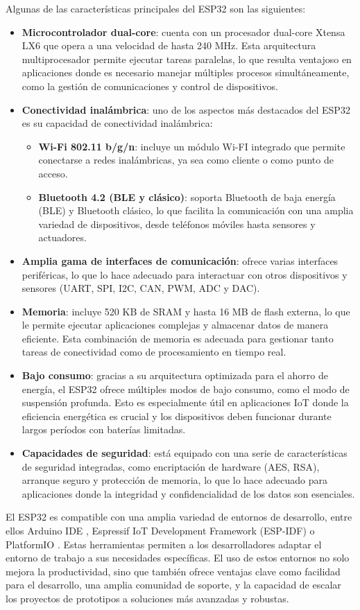  
Algunas de las características principales del ESP32 son las siguientes:
\begin{itemize}
    \item \textbf{Microcontrolador dual-core}: cuenta con un procesador dual-core Xtensa LX6 que opera a una velocidad de hasta 240 MHz. Esta arquitectura multiprocesador permite ejecutar tareas paralelas, lo que resulta ventajoso en aplicaciones donde es necesario manejar múltiples procesos simultáneamente, como la gestión de comunicaciones y control de dispositivos.
    \item \textbf{Conectividad inalámbrica}: uno de los aspectos más destacados del ESP32 es su capacidad de conectividad inalámbrica:
        \begin{itemize}
            \item \textbf{Wi-Fi 802.11 b/g/n}: incluye un módulo Wi-FI integrado que permite conectarse a redes inalámbricas, ya sea como cliente o como punto de acceso.
            \item \textbf{Bluetooth 4.2 (BLE y clásico)}: soporta Bluetooth de baja energía (BLE) y Bluetooth clásico, lo que facilita la comunicación con una amplia variedad de dispositivos, desde teléfonos móviles hasta sensores y actuadores.
        \end{itemize}
    \item \textbf{Amplia gama de interfaces de comunicación}: ofrece varias interfaces periféricas, lo que lo hace adecuado para interactuar con otros dispositivos y sensores (UART, SPI, I2C, CAN, PWM, ADC y DAC).
    \item \textbf{Memoria}: incluye 520 KB de SRAM y hasta 16 MB de flash externa, lo que le permite ejecutar aplicaciones complejas y almacenar datos de manera eficiente. Esta combinación de memoria es adecuada para gestionar tanto tareas de conectividad como de procesamiento en tiempo real.
    \item \textbf{Bajo consumo}: gracias a su arquitectura optimizada para el ahorro de energía, el ESP32 ofrece múltiples modos de bajo consumo, como el modo de suspensión profunda. Esto es especialmente útil en aplicaciones IoT donde la eficiencia energética es crucial y los dispositivos deben funcionar durante largos períodos con baterías limitadas.
    \item \textbf{Capacidades de seguridad}: está equipado con una serie de características de seguridad integradas, como encriptación de hardware (AES, RSA), arranque seguro y protección de memoria, lo que lo hace adecuado para aplicaciones donde la integridad y confidencialidad de los datos son esenciales.
\end{itemize}


El ESP32 es compatible con una amplia variedad de entornos de desarrollo, entre ellos Arduino IDE \cite{arduino_ide}, Espressif IoT Development Framework (ESP-IDF) \cite{esp_ids} o PlatformIO \cite{platformio}. 
Estas herramientas permiten a los desarrolladores adaptar el entorno de trabajo a sus necesidades específicas. El uso de estos entornos no solo mejora la productividad, sino que también ofrece ventajas clave como facilidad para el desarrollo, una amplia comunidad de soporte, y la capacidad de escalar los proyectos de prototipos a soluciones más avanzadas y robustas.

